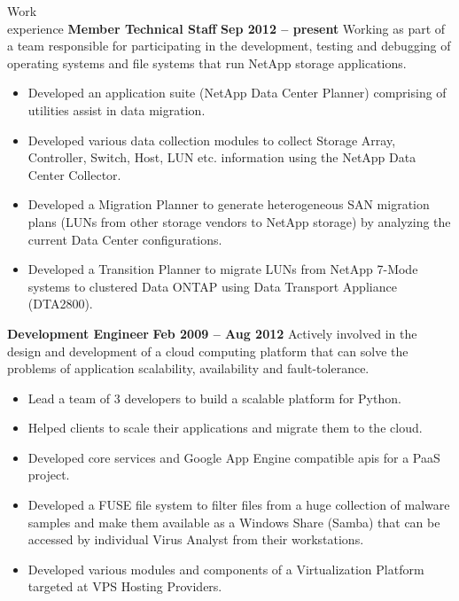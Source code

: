 \documentclass{resume}
\begin{document}
\begin{category}{Work \\experience}
  \citemnobullet \textbf{Member Technical Staff} \hfill \textbf{Sep 2012 -- present}
  \citemnobullet Working as part of a team responsible for participating in the development, 
  testing and debugging of operating systems and file systems that run NetApp storage applications.
  \begin{itemize}
  \item Developed an application suite (NetApp Data Center Planner) comprising of utilities 
  assist in data migration.
  \item Developed various data collection modules to collect Storage Array, Controller, Switch, Host, 
  LUN etc. information using the NetApp Data Center Collector.
  \item Developed a Migration Planner to generate heterogeneous SAN migration plans (LUNs from 
  other storage vendors to NetApp storage) by analyzing the current Data Center configurations.
  \item Developed a Transition Planner to migrate LUNs from NetApp 7-Mode systems to clustered
  Data ONTAP using Data Transport Appliance (DTA2800).
  \end{itemize}
  \citemnobullet \textbf{Development Engineer} \hfill \textbf{Feb 2009 -- Aug 2012}
  \citemnobullet Actively involved in the design and development of a cloud computing platform 
  that can solve the problems of application scalability, availability and fault-tolerance.
  \begin{itemize} 
  \item Lead a team of 3 developers to build a scalable platform for Python.
  \item Helped clients to scale their applications and migrate them to the cloud.
  \item Developed core services and Google App Engine compatible apis for a PaaS project.
  \item Developed a FUSE file system to filter files from a huge collection of malware samples 
  and make them available as a Windows Share (Samba) that can be accessed by individual 
  Virus Analyst from their workstations.
  \item Developed various modules and components of a Virtualization Platform targeted at VPS Hosting
  Providers.
  \end{itemize}
\end{category}
\end{document}

